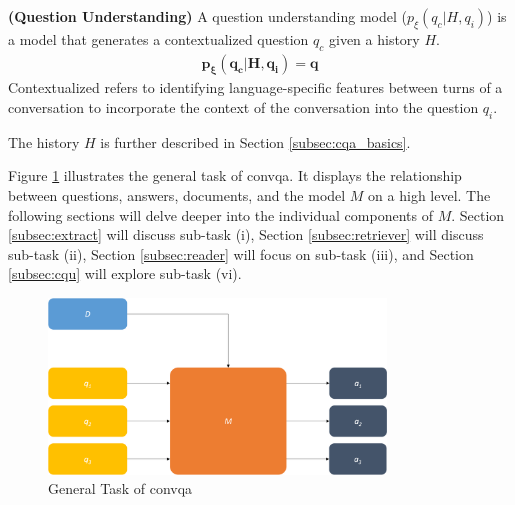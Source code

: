 \begin{definition}
    \textbf{(Question Understanding)} A question understanding model ($p_\xi(q_c|H,q_i)$) is a model that generates a contextualized question $q_c$ given a history $H$.
    \begin{align*}
        \mathbf{p_\xi(q_c|H, q_i) = q}
    \end{align*}
    Contextualized refers to identifying language-specific features between turns of a conversation to incorporate the context of the conversation into the question $q_i$.
    \label{def:question_understanding}
\end{definition}

The history $H$ is further described in Section \ref{subsec:cqa_basics}.

Figure \ref{fig:task_convqa} illustrates the general task of \gls{convqa}. It displays the relationship between questions, answers, documents, and the model $M$ on a high level. The following sections will delve deeper into the individual components of $M$. Section \ref{subsec:extract} will discuss sub-task (i), Section \ref{subsec:retriever} will discuss sub-task (ii), Section \ref{subsec:reader} will focus on sub-task (iii), and Section \ref{subsec:cqu} will explore sub-task (vi).

\begin{figure}
    \centering
    \includegraphics[width=0.8\textwidth]{Grafiken/general_conqa.png}
    \caption{General Task of \gls{convqa}}
    \label{fig:task_convqa}
\end{figure}



